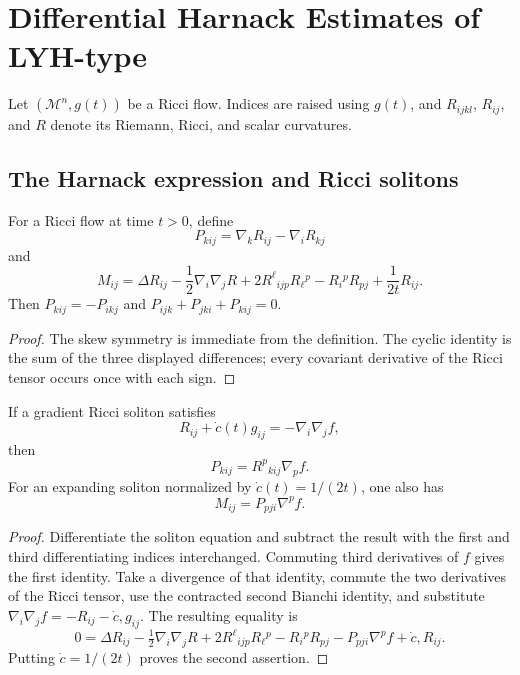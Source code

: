 \chapter[15]{Differential Harnack Estimates of LYH-type}
\label{ch:chow-ii-differential-harnack-estimates}

Let \((\mathcal M^n,g(t))\) be a Ricci flow.  Indices are raised using
\(g(t)\), and \(R_{ijkl}\), \(R_{ij}\), and \(R\) denote its Riemann,
Ricci, and scalar curvatures.

\section{The Harnack expression and Ricci solitons}

\begin{definition}
\label{def:chow-ii-harnack-p-and-m-tensors}

For a Ricci flow at time \(t>0\), define
\[
P_{kij}=\nabla_kR_{ij}-\nabla_iR_{kj}
\]
and
\[
M_{ij}=\Delta R_{ij}-\frac12\nabla_i\nabla_jR
 +2R^{\ell}{}_{ijp}R_{\ell}{}^p-R_i{}^pR_{pj}+\frac1{2t}R_{ij}.
\]
Then \(P_{kij}=-P_{ikj}\) and
\(P_{ijk}+P_{jki}+P_{kij}=0\).
\end{definition}
\begin{proof}
\sketch The skew symmetry is immediate from the definition.  The cyclic identity is
the sum of the three displayed differences; every covariant derivative of the
Ricci tensor occurs once with each sign.
\end{proof}

\begin{lemma}
\label{lem:chow-ii-soliton-harnack-identities}


If a gradient Ricci soliton satisfies
\[
R_{ij}+\dot c(t)g_{ij}=-\nabla_i\nabla_jf,
\]
then
\[
P_{kij}=R^p{}_{kij}\nabla_pf.
\]
For an expanding soliton normalized by \(\dot c(t)=1/(2t)\), one also has
\[
M_{ij}=P_{pji}\nabla^pf.
\]
\end{lemma}
\begin{proof}
\sketch Differentiate the soliton equation and subtract the result with the first and
third differentiating indices interchanged.  Commuting third derivatives of
\(f\) gives the first identity.  Take a divergence of that identity, commute
the two derivatives of the Ricci tensor, use the contracted second Bianchi
identity, and substitute
\(\nabla_i\nabla_jf=-R_{ij}-\dot c,g_{ij}\).  The resulting equality is
\[
0=\Delta R_{ij}-\tfrac12\nabla_i\nabla_jR
 +2R^\ell{}_{ijp}R_\ell{}^p-R_i{}^pR_{pj}
-P_{pji}\nabla^pf+\dot c,R_{ij}.
\]
Putting \(\dot c=1/(2t)\) proves the second assertion.
\end{proof}

